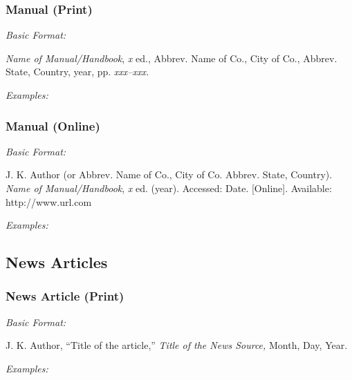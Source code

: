 \documentclass[10pt]{article}
\newcommand*{\guidelabel}[1]{\par\vspace{-4pt}\hspace*{22pt}\textit{#1}\par\vspace{-\parskip}}
\begin{document}
\subsubsection{Manual (Print)}
\guidelabel{Basic Format:}
\begin{guideitems}
  \item \textit{Name of Manual/Handbook}, \textit{x} ed., Abbrev. Name of Co., City of Co., Abbrev. State, Country, year, pp. \textit{xxx–xxx.}
\end{guideitems}
\guidelabel{Examples:}
\begin{guideitems}
  \item {}
  \item {}
  \item {}
  \item {}
\end{guideitems}

\subsubsection{Manual (Online)}
\guidelabel{Basic Format:}
\begin{guideitems}
  \item J. K. Author (or Abbrev. Name of Co., City of Co. Abbrev. State, Country). \textit{Name of Manual/Handbook}, \textit{x} ed. (year). Accessed: Date. [Online]. Available: http://www.url.com
\end{guideitems}
\guidelabel{Examples:}
\begin{guideitems}
  \item {}
  \item {}
\end{guideitems}

\subsection{News Articles}

\subsubsection{News Article (Print)}
\guidelabel{Basic Format:}
\begin{guideitems}
  \item J. K. Author, “Title of the article,” \textit{Title of the News Source,} Month, Day, Year.
\end{guideitems}
\guidelabel{Examples:}
\begin{guideitems}
  \item {}
  \item {}
\end{guideitems}
\end{document}
